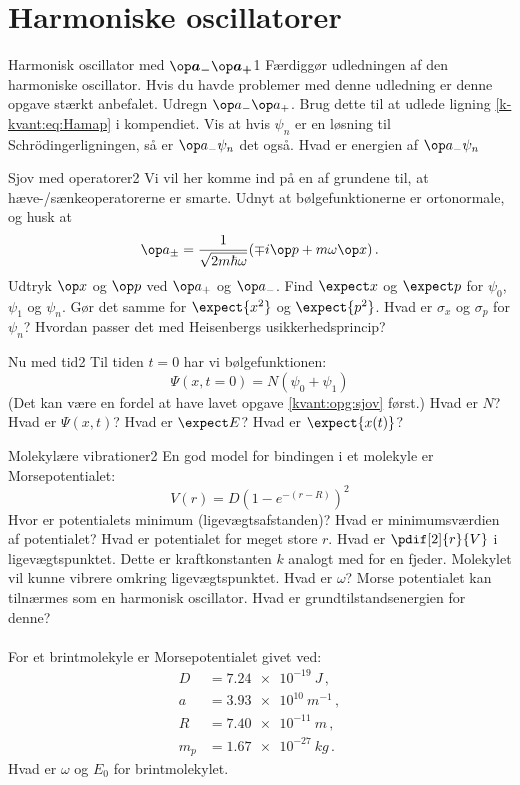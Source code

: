 \section*{Harmoniske oscillatorer}
\begin{opgave}{Harmonisk oscillator med $\boldsymbol{\op a_- \op a_+}$}{1}
\label{kvant:opg:amap}
Færdiggør udledningen af den harmoniske oscillator. Hvis du havde problemer med denne udledning er denne opgave stærkt anbefalet.
\opg Udregn $\op a_-\op a_+$.
\opg Brug dette til at udlede ligning \eqref{k-kvant:eq:Hamap} i kompendiet.
\opg Vis at hvis $\psi_n$ er en løsning til Schrödingerligningen, så er $\op a_-\psi_n$ det også.
\opg Hvad er energien af $\op a_- \psi_n$
\end{opgave}
%
\begin{opgave}{Sjov med operatorer}{2}
\label{kvant:opg:sjov}
Vi vil her komme ind på en af grundene til, at hæve-/sænkeoperatorerne er smarte. Udnyt at bølgefunktionerne er ortonormale, og husk at
$$
\op a_\pm = \frac{1}{\sqrt{2 m \hbar\omega}}(\mp i\op p+m\omega \op x) \, .
$$
\opg Udtryk $\op x$ og $\op p$ ved $\op a_+$ og $\op a_-$.
\opg Find $\expect x$ og $\expect p$ for $\psi_0$, $\psi_1$ og $\psi_{n}$.
\opg Gør det samme for $\expect{x^2}$ og $\expect{p^2}$.
\opg Hvad er $\sigma_x$ og $\sigma_p$ for $\psi_n$?
\opg Hvordan passer det med Heisenbergs usikkerhedsprincip?
\end{opgave}
%
\begin{opgave}{Nu med tid}{2}
Til tiden $t=0$ har vi bølgefunktionen: $$\Psi(x,t=0) = N(\psi_0+\psi_1)$$ (Det kan være en fordel at have lavet opgave \ref{kvant:opg:sjov} først.)
\opg Hvad er $N$?
\opg Hvad er $\Psi(x,t)$?
\opg Hvad er $\expect E$?
\opg Hvad er $\expect {x(t)}$?
\end{opgave}
%
\begin{opgave}{Molekylære vibrationer}{2}
En god model for bindingen i et molekyle er Morsepotentialet:
$$
V(r) = D\left(1-e^{-(r-R)}\right)^2
$$
\opg Hvor er potentialets minimum (ligevægtsafstanden)?
\opg Hvad er minimumsværdien af potentialet?
\opg Hvad er potentialet for meget store $r$.
\opg Hvad er $\pdif[2]{r}{V}$ i ligevægtspunktet. Dette er kraftkonstanten $k$ analogt med for en fjeder.
\opg Molekylet vil kunne vibrere omkring ligevægtspunktet. Hvad er $\omega$?
\opg Morse potentialet kan tilnærmes som en harmonisk oscillator. Hvad er grundtilstandsenergien for denne?\\ \\
For et brintmolekyle er Morsepotentialet givet ved:
\begin{align*}
D&=\SI{7.24e-19}{J} \, ,\\
a &= \SI{3.93e10}{m^{-1}} \, ,\\
R &= \SI{7.40e-11}{m} \, ,\\
m_p&=\SI{1.67e-27}{kg} \, .
\end{align*}
\opg Hvad er $\omega$ og $E_0$ for brintmolekylet.
\end{opgave}